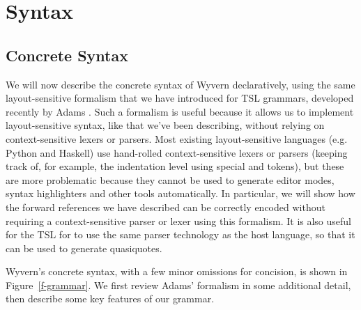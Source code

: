 \section{Syntax}
\label{s:approach}

\subsection{Concrete Syntax}
We will now describe the concrete syntax of Wyvern declaratively, using the same layout-sensitive formalism that we have introduced for TSL grammars, developed recently by Adams \cite{Adams:2013:PPI:2429069.2429129}. Such a formalism is useful because it allows us to implement  layout-sensitive syntax, like that we've been describing, without relying on context-sensitive lexers or parsers. Most existing layout-sensitive languages (e.g. Python and Haskell) use hand-rolled context-sensitive lexers or parsers (keeping track of, for example, the indentation level using special  and  tokens), but these are more problematic because they cannot be used to generate editor modes, syntax highlighters and other tools automatically. In particular, we will show how the forward references we have described can be correctly encoded without requiring a context-sensitive parser or lexer using this formalism. It is also useful for the TSL for  to use the same parser technology as the host language, so that it can be used to generate quasiquotes.

Wyvern's concrete syntax, with a few minor omissions for concision, is shown in Figure~\ref{f-grammar}. We first review Adams' formalism in some additional detail, then describe some key features of our grammar.

